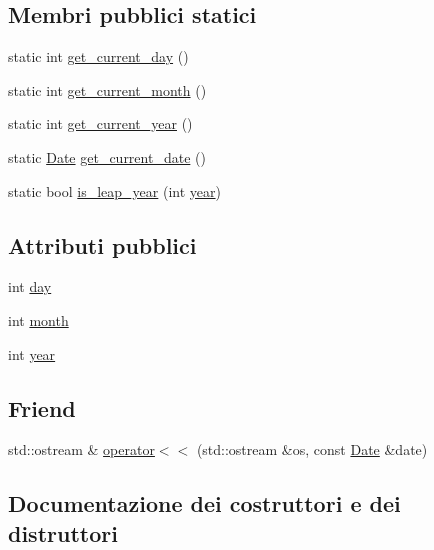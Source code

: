 \subsection*{Membri pubblici statici}
\begin{DoxyCompactItemize}
\item 
static int \hyperlink{structmm_1_1util_1_1_date_ad5ed2bc80bbaa949aa13707a73064345}{get\+\_\+current\+\_\+day} ()
\item 
static int \hyperlink{structmm_1_1util_1_1_date_ab3da347f3603aa3a7fe057a5a0d012d2}{get\+\_\+current\+\_\+month} ()
\item 
static int \hyperlink{structmm_1_1util_1_1_date_afec17843da4296a2341290107901eaa5}{get\+\_\+current\+\_\+year} ()
\item 
static \hyperlink{structmm_1_1util_1_1_date}{Date} \hyperlink{structmm_1_1util_1_1_date_af0758fad7ef32fd535db3295136466eb}{get\+\_\+current\+\_\+date} ()
\item 
static bool \hyperlink{structmm_1_1util_1_1_date_a89c7d3f4d8af79878a28815ffbe2e536}{is\+\_\+leap\+\_\+year} (int \hyperlink{structmm_1_1util_1_1_date_a318909ff98468f29c7912fa9cffea079}{year})
\end{DoxyCompactItemize}
\subsection*{Attributi pubblici}
\begin{DoxyCompactItemize}
\item 
int \hyperlink{structmm_1_1util_1_1_date_a6a697c80be4f09cdb4ee400721314d87}{day}
\item 
int \hyperlink{structmm_1_1util_1_1_date_a018f3e7261b88c9a47aae5b08120b331}{month}
\item 
int \hyperlink{structmm_1_1util_1_1_date_a318909ff98468f29c7912fa9cffea079}{year}
\end{DoxyCompactItemize}
\subsection*{Friend}
\begin{DoxyCompactItemize}
\item 
std\+::ostream \& \hyperlink{structmm_1_1util_1_1_date_a1862604492a841a6b98e1a3061d95b96}{operator$<$$<$} (std\+::ostream \&os, const \hyperlink{structmm_1_1util_1_1_date}{Date} \&date)
\end{DoxyCompactItemize}


\subsection{Documentazione dei costruttori e dei distruttori}
\mbox{\label{structmm_1_1util_1_1_date_afe2513fbf246f7f3e61e7d1a06d0e6d0}} 
